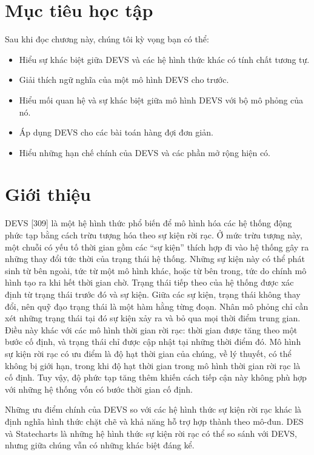 \section*{Mục tiêu học tập}
Sau khi đọc chương này, chúng tôi kỳ vọng bạn có thể:
\begin{itemize}
\item Hiểu sự khác biệt giữa DEVS và các hệ hình thức khác có tính chất tương tự.
\item Giải thích ngữ nghĩa của một mô hình DEVS cho trước.
\item Hiểu mối quan hệ và sự khác biệt giữa mô hình DEVS với bộ mô phỏng của nó.
\item Áp dụng DEVS cho các bài toán hàng đợi đơn giản.
\item Hiểu những hạn chế chính của DEVS và các phần mở rộng hiện có.
\end{itemize}

\section{Giới thiệu}
DEVS [309] là một hệ hình thức phổ biến để mô hình hóa các hệ thống động phức tạp bằng cách trừu tượng hóa theo sự kiện rời rạc. Ở mức trừu tượng này, một chuỗi có yếu tố thời gian gồm các ``sự kiện'' thích hợp đi vào hệ thống gây ra những thay đổi tức thời của trạng thái hệ thống. Những sự kiện này có thể phát sinh từ bên ngoài, tức từ một mô hình khác, hoặc từ bên trong, tức do chính mô hình tạo ra khi hết thời gian chờ. Trạng thái tiếp theo của hệ thống được xác định từ trạng thái trước đó và sự kiện. Giữa các sự kiện, trạng thái không thay đổi, nên quỹ đạo trạng thái
là một hàm hằng từng đoạn. Nhân mô phỏng chỉ cần xét những trạng thái tại đó sự kiện xảy ra và bỏ qua mọi thời điểm trung gian. Điều này khác với các mô hình thời gian rời rạc: thời gian được tăng theo một bước cố định, và trạng thái chỉ được cập nhật tại những thời điểm đó. Mô hình sự kiện rời rạc có ưu điểm là độ hạt thời gian của chúng, về lý thuyết, có thể không bị giới hạn, trong khi độ hạt thời gian trong mô hình thời gian rời rạc là cố định. Tuy vậy, độ phức tạp tăng thêm khiến cách tiếp cận này không phù hợp với những hệ thống vốn có bước thời gian cố định.

Những ưu điểm chính của DEVS so với các hệ hình thức sự kiện rời rạc khác là định nghĩa hình thức chặt chẽ và khả năng hỗ trợ hợp thành theo mô-đun. DES và Statecharts là những hệ hình thức sự kiện rời rạc có thể so sánh với DEVS, nhưng giữa chúng vẫn có những khác biệt đáng kể.

